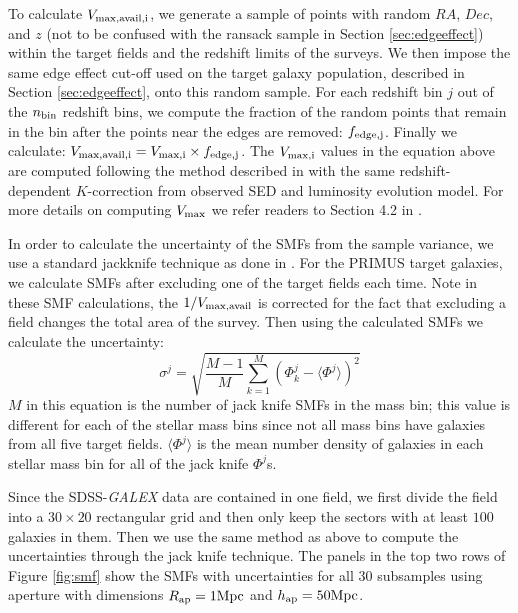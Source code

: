 \documentclass{emulateapj}
\begin{document}
To calculate $V_{\rm{max,avail},i}$, we generate a sample of points with random $RA$, $Dec$, and $z$ (not to be confused with the ransack sample in Section \ref{sec:edgeeffect}) 
within the target fields and the redshift limits of the surveys.
We then impose the same edge effect cut-off used on the target galaxy population, described in Section \ref{sec:edgeeffect}, onto this random sample. 
For each redshift bin $j$ out of the $n_{\rm{bin}}$ redshift bins, we compute the fraction of the random points that remain in the bin after the points near the edges are removed: 
$f_{\rm{edge},j}$.
Finally we calculate: $V_{\rm{max,avail},i} = V_{\rm{max},i} \times f_{\rm{edge},j}$. 
The $V_{\rm{max},i}$ values in the equation above are computed following the method described in \cite{Moustakas:2013aa} with the same redshift-dependent $K$-correction 
from observed SED and luminosity evolution model.
For more details on computing $V_{\rm{max}}$ we refer readers to Section 4.2 in \cite{Moustakas:2013aa}. 

In order to calculate the uncertainty of the SMFs from the sample variance, we use a standard jackknife technique as done in \cite{Moustakas:2013aa}.
For the PRIMUS target galaxies, we calculate SMFs after excluding one of the target fields each time.
Note in these SMF calculations, the $1/V_{\rm{max},\rm{avail}}$ is corrected for the fact that excluding a field changes the total area of the survey.
Then using the calculated SMFs we calculate the uncertainty: 
\begin{equation}
\sigma^j = \sqrt{\frac{M-1}{M} \sum\limits_{k=1}^{M} (\Phi^j_k - \langle \Phi^j \rangle)^2}
\end{equation} 
$M$ in this equation is the number of jack knife SMFs in the mass bin; this value is different for each of the stellar mass bins since not all mass bins have galaxies from all five target fields.
$\langle \Phi^j \rangle$ is the mean number density of galaxies in each stellar mass bin for all of the jack knife $\Phi^j$s.

Since the SDSS-{\em GALEX} data are contained in one field, we first divide the field into a $30 \times 20$ rectangular grid and then only keep the sectors with at least $100$ galaxies in them. 
Then we use the same method as above to compute the uncertainties through the jack knife technique. 
The panels in the top two rows of Figure \ref{fig:smf} show the SMFs with uncertainties for all $30$ subsamples using aperture with dimensions $R_{\rm{ap}} = 1 \rm{Mpc}$ and $h_{\rm{ap}} = 50 \rm{Mpc}$.  
\end{document}
